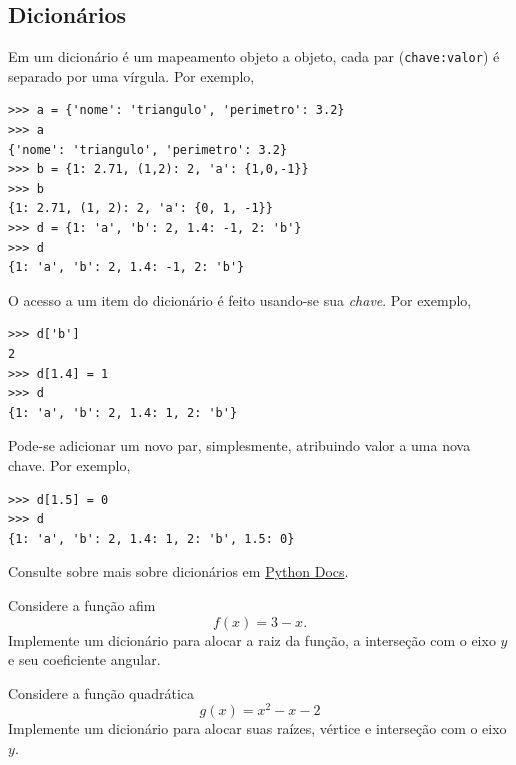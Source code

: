 \documentclass[12pt]{article}
\begin{document}
\subsection{Dicionários}

Em {\python} um dicionário é um mapeamento objeto a objeto, cada par (\verb+chave:valor+) é separado por uma vírgula. Por exemplo,

\begin{lstlisting}
>>> a = {'nome': 'triangulo', 'perimetro': 3.2}
>>> a
{'nome': 'triangulo', 'perimetro': 3.2}
>>> b = {1: 2.71, (1,2): 2, 'a': {1,0,-1}}
>>> b
{1: 2.71, (1, 2): 2, 'a': {0, 1, -1}}
>>> d = {1: 'a', 'b': 2, 1.4: -1, 2: 'b'}
>>> d
{1: 'a', 'b': 2, 1.4: -1, 2: 'b'}
\end{lstlisting}

O acesso a um item do dicionário é feito usando-se sua \emph{chave}. Por exemplo,

\begin{lstlisting}
>>> d['b']
2
>>> d[1.4] = 1
>>> d
{1: 'a', 'b': 2, 1.4: 1, 2: 'b'}
\end{lstlisting}

Pode-se adicionar um novo par, simplesmente, atribuindo valor a uma nova chave. Por exemplo,

\begin{lstlisting}
>>> d[1.5] = 0
>>> d
{1: 'a', 'b': 2, 1.4: 1, 2: 'b', 1.5: 0}
\end{lstlisting}

\begin{obs}
  Consulte sobre mais sobre dicionários em \href{https://docs.python.org/3/tutorial/datastructures.html#dictionaries}{Python Docs}.
\end{obs}

\begin{exr}
  Considere a função afim
  \begin{equation}
    f(x) = 3 - x.
  \end{equation}
  Implemente um dicionário para alocar a raiz da função, a interseção com o eixo $y$ e seu coeficiente angular.
\end{exr}

\begin{exr}
  Considere a função quadrática
  \begin{equation}
    g(x) = x^2 - x - 2
  \end{equation}
  Implemente um dicionário para alocar suas raízes, vértice e interseção com o eixo $y$.
\end{exr}
\end{document}
